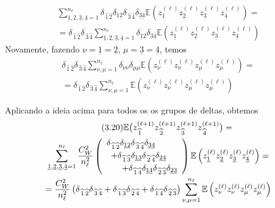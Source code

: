\documentclass{beamer}
\newcommand{\EE}{\mathbb{E}}
\def\mi#1{{\,\widehat{#1}}}
\def\mj#1{\underline{#1}}
\def\eell{{(\ell)}}
\def\eellum{{(\ell+1)}}
\begin{document}
\begin{frame}
	\begin{multline*}
		\sum_{\mj1,\mj2,\mj3,\mj4=1}^{n_\ell} \delta_{\mi1\mi2}\delta_{\mj1\mj2}\delta_{\mi3\mi4}\delta_{\mj3\mj4} \EE\left( z^\eell_{\mj1}z^\eell_{\mj2}z^\eell_{\mj3}z^\eell_{\mj4}\right) = \\
		= \delta_{\mi1\mi2}\delta_{\mi3\mi4}\sum_{\mj1,\mj2,\mj3,\mj4=1}^{n_\ell} \delta_{\mj1\mj2}\delta_{\mj3\mj4} \EE\left( z^\eell_{\mj1}z^\eell_{\mj2}z^\eell_{\mj3}z^\eell_{\mj4}\right) 
	\end{multline*}
Novamente, fazendo $\nu = \mj1 = \mj2$, $\mu = \mj3 = \mj4$, temos
\begin{multline*}
		\delta_{\mi1\mi2}\delta_{\mi3\mi4}\sum_{\nu,\mu=1}^{n_\ell} \delta_{\nu\nu}\delta_{\mu\mu} \EE\left( z^\eell_{\nu}z^\eell_{\nu}z^\eell_{\mu}z^\eell_{\mu}\right) = \\ 
		=\delta_{\mi1\mi2}\delta_{\mi3\mi4}\sum_{\nu,\mu=1}^{n_\ell} \EE\left( z^\eell_{\nu}z^\eell_{\nu} z^\eell_{\mu}z^\eell_{\mu}\right)
\end{multline*}
\end{frame}

\begin{frame}
	Aplicando a ideia acima para todos os os grupos de deltas, obtemos
	\begin{multline*}\tag{3.20}
		\EE\big(z^\eellum_{\mi1} z^\eellum_{\mi2} z^\eellum_{\mi3} z^\eellum_{\mi4}\big) = \\
		\sum_{\mj1,\mj2,\mj3,\mj4=1}^{n_\ell}\frac{C_W^2}{n_\ell^2}\left(\begin{array}{r}
			\delta_{\mi1\mi2}\delta_{\mj1\mj2}\delta_{\mi3\mi4}\delta_{\mj3\mj4} \hspace{6ex} \\[1mm] 
			+\delta_{\mi1\mi3}\delta_{\mj1\mj3} \delta_{\mi2\mi4}\delta_{\mj2\mj4} \hspace{3ex} \\[1mm]
			+  \delta_{\mi1\mi4}\delta_{\mj1\mj4} \delta_{\mi2\mi3}\delta_{\mj2\mj3}
		\end{array}\right)\EE\left( z^\eell_{\mj1}z^\eell_{\mj2}z^\eell_{\mj3}z^\eell_{\mj4}\right) = \\
		= \frac{C_W^2}{n_\ell^2}\left(\delta_{\mi1\mi2}\delta_{\mi3\mi4}+\delta_{\mi1\mi3}\delta_{\mi2\mi4}+ \delta_{\mi1\mi4}\delta_{\mi2\mi3}\right)\sum_{\nu,\mu=1}^{n_\ell} \EE\left( z^\eell_{\nu}z^\eell_{\nu} z^\eell_{\mu}z^\eell_{\mu}\right)
	\end{multline*}
\end{frame}
\end{document}
